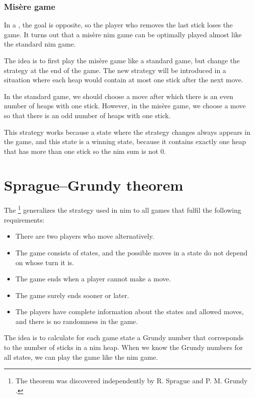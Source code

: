 \subsubsection{Misère game}


In a , the goal is opposite,
so the player who removes the last stick
loses the game.
It turns out that a misère nim game can be
optimally played almost like the standard nim game.

The idea is to first play the misère game
like a standard game, but change the strategy
at the end of the game.
The new strategy will be introduced in a situation
where each heap would contain at most one stick
after the next move.

In the standard game, we should choose a move
after which there is an even number of heaps with one stick.
However, in the misère game, we choose a move so that
there is an odd number of heaps with one stick.

This strategy works because a state where the
strategy changes always appears in the game,
and this state is a winning state, because
it contains exactly one heap that has more than one stick
so the nim sum is not 0.

\section{Sprague–Grundy theorem}


The \footnote{The theorem was discovered
independently by R. Sprague \cite{spr35} and P. M. Grundy \cite{gru39}.} generalizes the
strategy used in nim to all games that fulfil
the following requirements:

\begin{itemize}[noitemsep]
\item There are two players who move alternatively.
\item The game consists of states, and the possible moves
in a state do not depend on whose turn it is.
\item The game ends when a player cannot make a move.
\item The game surely ends sooner or later.
\item The players have complete information about
the states and allowed moves, and there is no randomness in the game.
\end{itemize}
The idea is to calculate for each game state
a Grundy number that corresponds to the number of
sticks in a nim heap.
When we know the Grundy numbers for all states,
we can play the game like the nim game.

